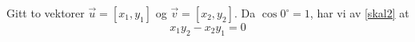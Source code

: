 



	
 Gitt to vektorer $ \vec{u}=[x_1, y_1] $ og $ \vec{v}=[x_2, y_2] $. Da $ \cos {0^\circ} =1 $, har vi av \eqref{skal2} at
\[ x_1 y_2-x_2 y_1=0 \] 
